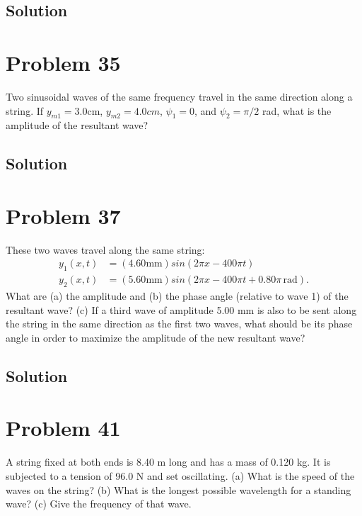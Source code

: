 \documentclass[12pt]{article}
\begin{document}
        \subsection{Solution}

    \section{Problem 35}
        Two sinusoidal waves of the same frequency travel in the same direction along a string. 
        If $y_{m1} = 3.0 \unit{\centi\meter}$, $y_{m2} = 4.0 cm$, $\psi_1 = 0$, and $\psi_2 = \pi/2$ rad, what is the amplitude of the resultant wave?

        \subsection{Solution}

    \section{Problem 37}
        These two waves travel along the same string:
        \begin{align}
            y_1(x, t)   &=  (4.60 \unit{\milli\meter}) sin(2\pi x - 400\pi t)\\
            y_2(x, t)   &=  (5.60 \unit{\milli\meter}) sin(2\pi x - 400\pi t + 0.80\pi\,\unit{\radian}).
        \end{align}
        What are (a) the amplitude and (b) the phase angle (relative to wave 1) of the resultant wave? 
        (c) If a third wave of amplitude 5.00 mm is also to be sent along the string in the same direction as the first two waves, what should be its phase angle in order to maximize the amplitude of the new resultant wave?

        \subsection{Solution}

    \section{Problem 41}
        A string fixed at both ends is 8.40 m long and has a mass of 0.120 kg. 
        It is subjected to a tension of 96.0 N and set oscillating. 
        (a) What is the speed of the waves on the string? 
        (b) What is the longest possible wavelength for a standing wave? 
        (c) Give the frequency of that wave.
\end{document}
